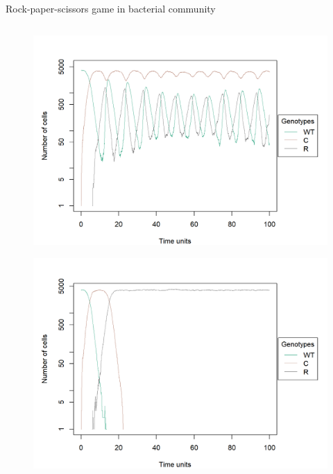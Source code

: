 \begin{frame}{Rock-paper-scissors game in bacterial community}
\begin{columns}
		\begin{column}{0.5\textwidth}
			\begin{figure}
				\includegraphics[scale=0.25]{img/CRS_caso2_2.png}			
			\end{figure}
			\begin{figure}
				\includegraphics[scale=0.25]{img/CRS_caso2_3.png}			
			\end{figure}
		\end{column}
	\end{columns}
\end{frame}


